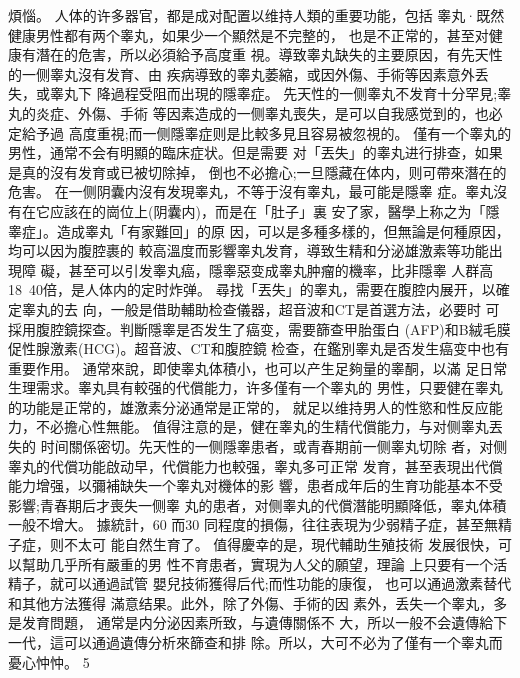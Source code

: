 \documentclass[12pt,UTF8]{ctexbook}
\begin{document}
煩惱。
人体的许多器官，都是成对配置以维持人類的重要功能，包括
睾丸·既然健康男性都有两个睾丸，如果少一个顯然是不完整的，
也是不正常的，甚至对健康有潛在的危害，所以必須給予高度重
視。導致睾丸缺失的主要原因，有先天性的一侧睾丸沒有发育、由
疾病導致的睾丸萎縮，或因外傷、手術等因素意外丢失，或睾丸下
降過程受阻而出現的隱睾症。
先天性的一侧睾丸不发育十分罕見;睾丸的炎症、外傷、手術
等因素造成的一侧睾丸喪失，是可以自我感觉到的，也必定給予過
高度重視;而一侧隱睾症则是比較多見且容易被忽視的。
僅有一个睾丸的男性，通常不会有明顯的臨床症状。但是需要
对「丟失」的睾丸进行排查，如果是真的沒有发育或已被切除掉，
倒也不必擔心;一旦隱藏在体内，则可帶來潛在的危害。
在一侧阴囊内沒有发現睾丸，不等于沒有睾丸，最可能是隱睾
症。睾丸沒有在它应該在的崗位上(阴囊内)，而是在「肚子」裏
安了家，醫學上称之为「隱睾症」。造成睾丸「有家難回」的原
因，可以是多種多樣的，但無論是何種原因，均可以因为腹腔裹的
較高溫度而影響睾丸发育，導致生精和分泌雄激素等功能出現障
礙，甚至可以引发睾丸癌，隱睾惡变成睾丸肿瘤的機率，比非隱睾
人群高18~40倍，是人体内的定时炸弹。
尋找「丟失」的睾丸，需要在腹腔内展开，以確定睾丸的去
向，一般是借助輔助检查儀器，超音波和CT是首選方法，必要时
可採用腹腔鏡探查。判斷隱睾是否发生了癌变，需要篩查甲胎蛋白
(AFP)和B絨毛膜促性腺激素(HCG)。超音波、CT和腹腔鏡
检查，在鑑別睾丸是否发生癌变中也有重要作用。
通常來說，即使睾丸体積小，也可以产生足夠量的睾酮，以滿
足日常生理需求。睾丸具有較强的代償能力，许多僅有一个睾丸的
男性，只要健在睾丸的功能是正常的，雄激素分泌通常是正常的，
就足以维持男人的性慾和性反应能力，不必擔心性無能。
值得注意的是，健在睾丸的生精代償能力，与对侧睾丸丟失的
时间關係密切。先天性的一侧隱睾患者，或青春期前一侧睾丸切除
者，对侧睾丸的代償功能啟动早，代償能力也較强，睾丸多可正常
发育，甚至表現出代償能力增强，以彌補缺失一个睾丸对機体的影
響，患者成年后的生育功能基本不受影響;青春期后才喪失一侧睾
丸的患者，对侧睾丸的代償潛能明顯降低，睾丸体積一般不增大。
據統計，60%
而30%
同程度的損傷，往往表現为少弱精子症，甚至無精子症，则不太可
能自然生育了。
值得慶幸的是，現代輔助生殖技術
发展很快，可以幫助几乎所有嚴重的男
性不育患者，實現为人父的願望，理論
上只要有一个活精子，就可以通過試管
嬰兒技術獲得后代;而性功能的康復，
也可以通過激素替代和其他方法獲得
滿意结果。此外，除了外傷、手術的因
素外，丢失一个睾丸，多是发育問題，
通常是内分泌因素所致，与遺傳關係不
大，所以一般不会遺傳給下一代，這可以通過遺傳分析來篩查和排
除。所以，大可不必为了僅有一个睾丸而憂心忡忡。
5
\end{document}
